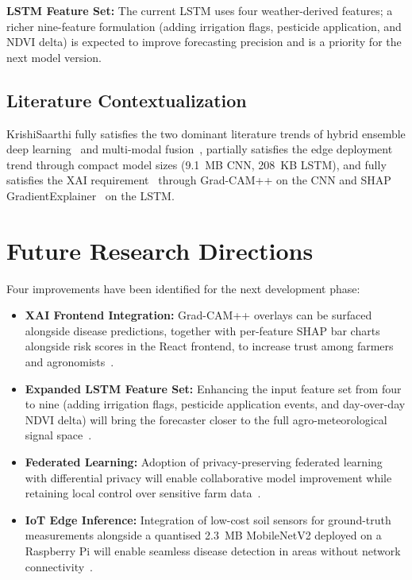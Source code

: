 \documentclass[conference]{IEEEtran}
\begin{document}
\textbf{LSTM Feature Set:} The current LSTM uses four weather-derived features; a richer nine-feature formulation (adding irrigation flags, pesticide application, and NDVI delta) is expected to improve forecasting precision and is a priority for the next model version.

\subsection{Literature Contextualization}

KrishiSaarthi fully satisfies the two dominant literature trends of hybrid ensemble deep learning~\cite{b1,b9,b20} and multi-modal fusion~\cite{b2,b21,b13}, partially satisfies the edge deployment trend through compact model sizes (9.1~MB CNN, 208~KB LSTM), and fully satisfies the XAI requirement~\cite{b3,b19} through Grad-CAM++ on the CNN and SHAP GradientExplainer~\cite{lundberg2017} on the LSTM.

\section{Future Research Directions}
\label{sec:future}

Four improvements have been identified for the next development phase:
\begin{itemize}
    \item \textbf{XAI Frontend Integration:} Grad-CAM++ overlays can be surfaced alongside disease predictions, together with per-feature SHAP bar charts alongside risk scores in the React frontend, to increase trust among farmers and agronomists~\cite{b3,b16}.
    \item \textbf{Expanded LSTM Feature Set:} Enhancing the input feature set from four to nine (adding irrigation flags, pesticide application events, and day-over-day NDVI delta) will bring the forecaster closer to the full agro-meteorological signal space~\cite{b21,b13}.
    \item \textbf{Federated Learning:} Adoption of privacy-preserving federated learning with differential privacy will enable collaborative model improvement while retaining local control over sensitive farm data~\cite{b11,b14}.
    \item \textbf{IoT Edge Inference:} Integration of low-cost soil sensors for ground-truth measurements alongside a quantised 2.3~MB MobileNetV2 deployed on a Raspberry Pi will enable seamless disease detection in areas without network connectivity~\cite{b5,b12}.
\end{itemize}
\end{document}
